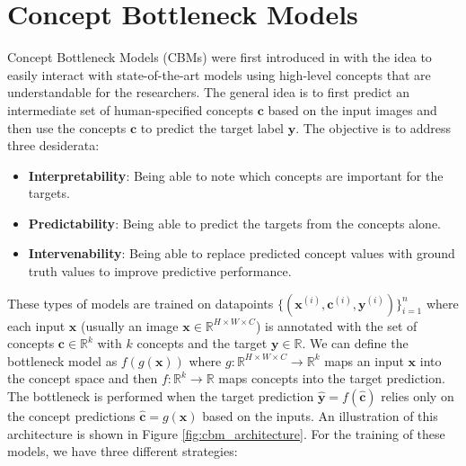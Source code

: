 \chapter{Concept Bottleneck Models}\label{ch:cbm}

Concept Bottleneck Models (CBMs) were first introduced in \cite{koh2020conceptbottleneckmodels} with the idea 
to easily interact with state-of-the-art models using high-level concepts that are understandable for the researchers. 
The general idea is to first predict an intermediate set of human-specified concepts $\mathbf{c}$ based on the input images 
and then use the concepts $\mathbf{c}$ to predict the target label $\mathbf{y}$. The objective is to address three desiderata: 
\cite{margeloiu2021conceptbottleneckmodelslearn}
\begin{itemize}
    \item \textbf{Interpretability}: Being able to note which concepts are important for the targets. 
    \item \textbf{Predictability}: Being able to predict the targets from the concepts alone. 
    \item \textbf{Intervenability}: Being able to replace predicted concept values with ground truth values to improve predictive performance. 
\end{itemize}
These types of models are trained on datapoints $\{(\mathbf{x}^{(i)}, \mathbf{c}^{(i)}, \mathbf{y}^{(i)})\}^n_{i=1}$ where each input $\mathbf{x}$ (usually 
an image $\mathbf{x}\in\mathbb{R}^{H\times W\times C}$) is annotated with the set of concepts $\mathbf{c}\in\mathbb{R}^k$ with $k$ concepts 
and the target $\mathbf{y}\in\mathbb{R}$. We can define the bottleneck model as $f(g(\mathbf{x}))$ where $g: \mathbb{R}^{H\times W\times C} 
\rightarrow \mathbb{R}^k$ maps an input $\mathbf{x}$ into the concept space and then $f: \mathbb{R}^k\rightarrow\mathbb{R}$ maps 
concepts into the target prediction. The bottleneck is performed when the target prediction $\mathbf{\hat y}=f(\mathbf{\hat c})$ relies only 
on the concept predictions $\mathbf{\hat c}=g(\mathbf{x})$ based on the inputs. An illustration of this architecture is shown in Figure \ref{fig:cbm_architecture}. 
For the training of these models, we have three different strategies: 
